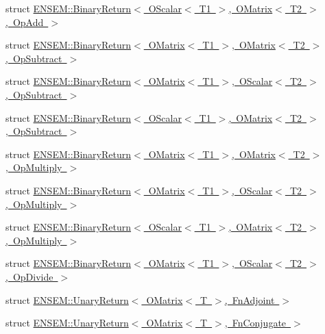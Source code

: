 \begin{DoxyCompactItemize}
\item 
struct \mbox{\hyperlink{structENSEM_1_1BinaryReturn_3_01OScalar_3_01T1_01_4_00_01OMatrix_3_01T2_01_4_00_01OpAdd_01_4}{E\+N\+S\+E\+M\+::\+Binary\+Return$<$ O\+Scalar$<$ T1 $>$, O\+Matrix$<$ T2 $>$, Op\+Add $>$}}
\item 
struct \mbox{\hyperlink{structENSEM_1_1BinaryReturn_3_01OMatrix_3_01T1_01_4_00_01OMatrix_3_01T2_01_4_00_01OpSubtract_01_4}{E\+N\+S\+E\+M\+::\+Binary\+Return$<$ O\+Matrix$<$ T1 $>$, O\+Matrix$<$ T2 $>$, Op\+Subtract $>$}}
\item 
struct \mbox{\hyperlink{structENSEM_1_1BinaryReturn_3_01OMatrix_3_01T1_01_4_00_01OScalar_3_01T2_01_4_00_01OpSubtract_01_4}{E\+N\+S\+E\+M\+::\+Binary\+Return$<$ O\+Matrix$<$ T1 $>$, O\+Scalar$<$ T2 $>$, Op\+Subtract $>$}}
\item 
struct \mbox{\hyperlink{structENSEM_1_1BinaryReturn_3_01OScalar_3_01T1_01_4_00_01OMatrix_3_01T2_01_4_00_01OpSubtract_01_4}{E\+N\+S\+E\+M\+::\+Binary\+Return$<$ O\+Scalar$<$ T1 $>$, O\+Matrix$<$ T2 $>$, Op\+Subtract $>$}}
\item 
struct \mbox{\hyperlink{structENSEM_1_1BinaryReturn_3_01OMatrix_3_01T1_01_4_00_01OMatrix_3_01T2_01_4_00_01OpMultiply_01_4}{E\+N\+S\+E\+M\+::\+Binary\+Return$<$ O\+Matrix$<$ T1 $>$, O\+Matrix$<$ T2 $>$, Op\+Multiply $>$}}
\item 
struct \mbox{\hyperlink{structENSEM_1_1BinaryReturn_3_01OMatrix_3_01T1_01_4_00_01OScalar_3_01T2_01_4_00_01OpMultiply_01_4}{E\+N\+S\+E\+M\+::\+Binary\+Return$<$ O\+Matrix$<$ T1 $>$, O\+Scalar$<$ T2 $>$, Op\+Multiply $>$}}
\item 
struct \mbox{\hyperlink{structENSEM_1_1BinaryReturn_3_01OScalar_3_01T1_01_4_00_01OMatrix_3_01T2_01_4_00_01OpMultiply_01_4}{E\+N\+S\+E\+M\+::\+Binary\+Return$<$ O\+Scalar$<$ T1 $>$, O\+Matrix$<$ T2 $>$, Op\+Multiply $>$}}
\item 
struct \mbox{\hyperlink{structENSEM_1_1BinaryReturn_3_01OMatrix_3_01T1_01_4_00_01OScalar_3_01T2_01_4_00_01OpDivide_01_4}{E\+N\+S\+E\+M\+::\+Binary\+Return$<$ O\+Matrix$<$ T1 $>$, O\+Scalar$<$ T2 $>$, Op\+Divide $>$}}
\item 
struct \mbox{\hyperlink{structENSEM_1_1UnaryReturn_3_01OMatrix_3_01T_01_4_00_01FnAdjoint_01_4}{E\+N\+S\+E\+M\+::\+Unary\+Return$<$ O\+Matrix$<$ T $>$, Fn\+Adjoint $>$}}
\item 
struct \mbox{\hyperlink{structENSEM_1_1UnaryReturn_3_01OMatrix_3_01T_01_4_00_01FnConjugate_01_4}{E\+N\+S\+E\+M\+::\+Unary\+Return$<$ O\+Matrix$<$ T $>$, Fn\+Conjugate $>$}}
\item 

\end{DoxyCompactItemize}
